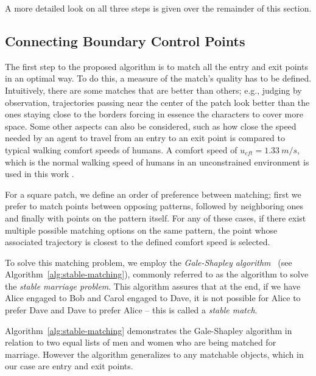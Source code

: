 A more detailed look on all three steps is given over the remainder of this section.

\subsection{Connecting Boundary Control Points}
\label{sec:method:init}

The first step to the proposed algorithm is to match all the entry and exit points in an optimal way.
To do this, a measure of the match's quality has to be defined.
Intuitively, there are some matches that are better than others; e.g., judging by observation, trajectories passing near the center of the patch look better than the ones staying close to the borders forcing in essence the characters to cover more space.
Some other aspects can also be considered, such as how close the speed needed by an agent to travel from an entry to an exit point is compared to typical walking comfort speeds of humans.
A comfort speed of $u_{cft} = 1.33~m/s$, which is the normal walking speed of humans in an unconstrained environment is used in this work \cite{Whittle2003Gait}.

For a square patch, we define an order of preference between matching; first we prefer to match points between opposing patterns, followed by neighboring ones and finally with points on the pattern itself.
For any of these cases, if there exist multiple possible matching options on the same pattern, the point whose associated trajectory is closest to the defined comfort speed is selected.

To solve this matching problem, we employ the \emph{Gale-Shapley algorithm}~\cite{gale1962college} (see Algorithm~\ref{alg:stable-matching}), commonly referred to as the algorithm to solve the \emph{stable marriage problem}. 
This algorithm assures that at the end, if we have Alice engaged to Bob and Carol engaged to Dave, it is not possible for Alice to prefer Dave and Dave to prefer Alice -- this is called a \emph{stable match}.  

Algorithm~\ref{alg:stable-matching} demonstrates the Gale-Shapley algorithm in relation to two equal lists of men and women who are being matched for marriage.
However the algorithm generalizes to any matchable objects, which in our case are entry and exit points.

